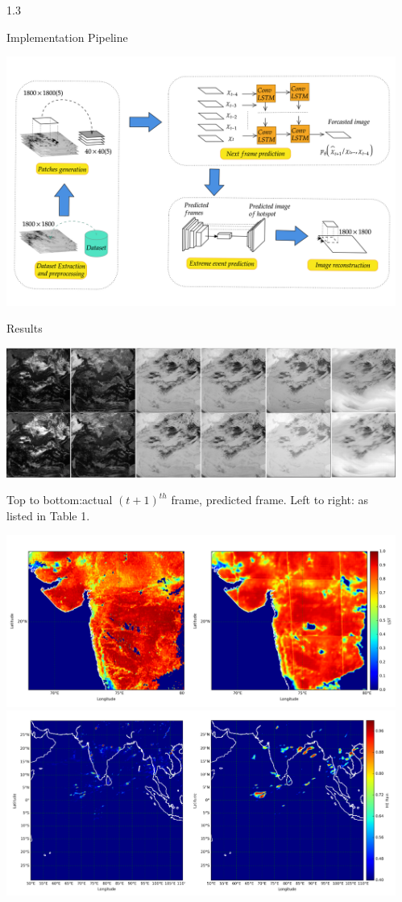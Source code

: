 \documentclass[final]{beamer}
\newlength{\sepwidth}
\newlength{\colwidth}
\newcommand{\separatorcolumn}{\begin{column}{\sepwidth}\end{column}}
\begin{document}
\begin{frame}[t]
\begin{columns}[t]
\separatorcolumn

\begin{column}{1.3\colwidth}

  \begin{block}{Implementation Pipeline}
  
  \begin{center}
    \includegraphics[width=0.7\columnwidth]{full.png}
    \end{center}
  
  
  \end{block}

  \begin{block}{Results}

    \begin{center}
    \includegraphics[width=0.7\columnwidth]{example-predictions-halfhour.jpg}
    
    Top to bottom:actual $(t+1)^{th}$ frame, predicted frame. Left to right: as listed in Table 1. 
    \end{center}  
    
    \begin{center}
    \includegraphics[width=0.53\columnwidth]{example-tem.png}
    \includegraphics[width=0.47\columnwidth]{example-hem.png}
    

\end{center}
\end{block}
\end{column}
\end{columns}
\end{frame}
\end{document}

